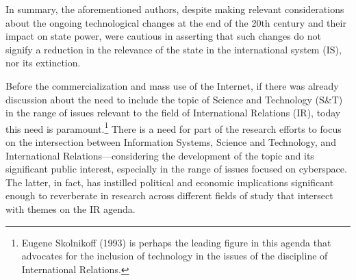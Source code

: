 In summary, the aforementioned authors, despite making relevant considerations about the ongoing technological changes at the end of the 20th century and their impact on state power, were cautious in asserting that such changes do not signify a reduction in the relevance of the state in the international system (IS), nor its extinction.

Before the commercialization and mass use of the Internet, if there was already discussion about the need to include the topic of Science and Technology (S\&T) in the range of issues relevant to the field of International Relations (IR), today this need is paramount.\footnote{Eugene Skolnikoff (1993) is perhaps the leading figure in this agenda that advocates for the inclusion of technology in the issues of the discipline of International Relations.} 
There is a need for part of the research efforts to focus on the intersection between Information Systems, Science and Technology, and International Relations—considering the development of the topic and its significant public interest, especially in the range of issues focused on cyberspace. The latter, in fact, has instilled political and economic implications significant enough to reverberate in research across different fields of study that intersect with themes on the IR agenda.

